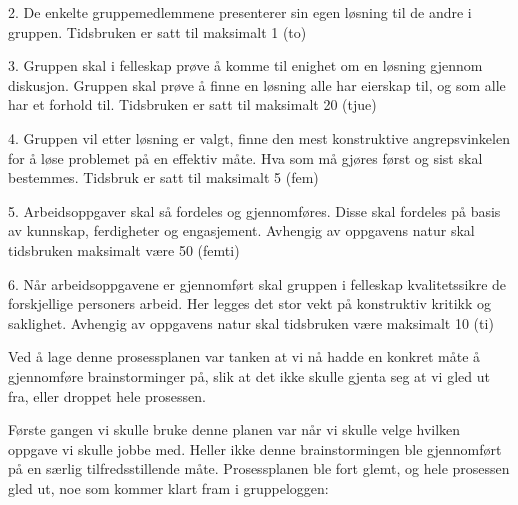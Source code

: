 2. De enkelte gruppemedlemmene presenterer sin egen løsning til de andre i gruppen. Tidsbruken er satt til maksimalt 1 (to) %

3. Gruppen skal i felleskap prøve å komme til enighet om en løsning gjennom diskusjon. Gruppen skal prøve å finne en løsning alle har eierskap til, og som alle har et forhold til. Tidsbruken er satt til maksimalt 20 (tjue) %

4. Gruppen vil etter løsning er valgt, finne den mest konstruktive angrepsvinkelen for å løse problemet på en effektiv måte. Hva som må gjøres først og sist skal bestemmes. Tidsbruk er satt til maksimalt 5 (fem) %

5. Arbeidsoppgaver skal så fordeles og gjennomføres. Disse skal fordeles på basis av kunnskap, ferdigheter og engasjement. Avhengig av oppgavens natur skal tidsbruken maksimalt være 50 (femti) %

6. Når arbeidsoppgavene er gjennomført skal gruppen i felleskap kvalitetssikre de forskjellige personers arbeid. Her legges det stor vekt på konstruktiv kritikk og saklighet. Avhengig av oppgavens natur skal tidsbruken være maksimalt 10 (ti) %

Ved å lage denne prosessplanen var tanken at vi nå hadde en konkret måte å gjennomføre brainstorminger på, slik at det ikke skulle gjenta seg at vi gled ut fra, eller droppet hele prosessen. \newline

Første gangen vi skulle bruke denne planen var når vi skulle velge hvilken oppgave vi skulle jobbe med. Heller ikke denne brainstormingen ble gjennomført på en særlig tilfredsstillende måte. Prosessplanen ble fort glemt, og hele prosessen gled ut, noe som kommer klart fram i gruppeloggen: \newline

